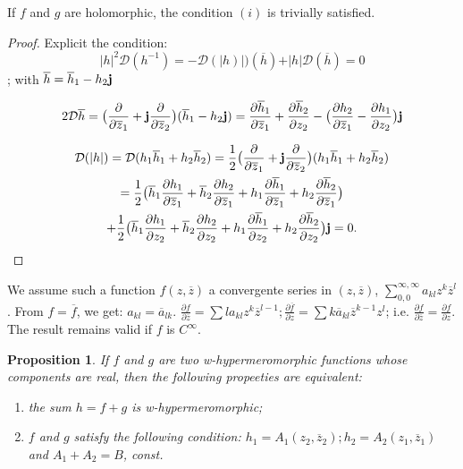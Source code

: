 \documentclass[12pt]{amsart}
\newtheorem{prop}[thm]{Proposition}
\theoremstyle{definition}
\begin{document}
If $f$ and $g$ are holomorphic, the condition $(i)$ is trivially satisfied. 

\begin{proof}Explicit the condition: $${\vert h\vert}^2{\mathcal D}(h^{-1})=-{\mathcal D}(\vert h)\vert)(\overline {h})+\vert h\vert {\mathcal D}(\overline {h})=0$$; with $\overline h=\overline h_1-h_2{\bf j}$ 
 

$$
2{\mathcal D}\overline h=\big(\frac{\partial}{\partial\overline z_1}
+{\bf j}\frac{\partial}{\partial\overline z_2}\big)(\overline h_1-h_2{\bf j})= \frac{\partial\overline h_1}{\partial\overline z_1}+\frac{\partial \overline h_2}{\partial z_2}-\big(\frac{\partial h_2}{\partial\overline z_1}-\frac{\partial h_1}{\partial z_2}\big){\bf j}
$$

\begin{multline*}
{\mathcal D}(\vert h\vert)={\mathcal D}(h_1\overline h_1+h_2\overline h_2)=\frac{1}{2}\big(\frac{\partial}{\partial\overline z_1}
+{\bf j}\frac{\partial}{\partial\overline z_2}\big)(h_1\overline h_1+h_2\overline h_2)
\\
=
\frac{1}{2}\big(\overline h_1\frac{\partial h_1}{\partial\overline z_1} +\overline h_2\frac{\partial h_2}{\partial\overline z_1} +h_1\frac{\partial\overline h_1}{\partial\overline z_1} +h_2\frac{\partial\overline h_2}{\partial\overline z_1}\big)
\\
+\frac{1}{2}\big(\overline h_1\frac{\partial h_1}{\partial z_2} +\overline h_2\frac{\partial h_2}{\partial z_2}+h_1\frac{\partial\overline h_1}{\partial z_2} +h_2\frac{\partial\overline h_2}{\partial z_2}\big){\bf j}=0.
\end{multline*}\end{proof}

 We assume such a function $f(z,\overline z)$ a convergente series in $(z,\overline z)$, $\displaystyle \sum_{0,0}^{\infty,\infty} a_{kl}z^k\overline z^l$. From $f=\overline f$, we get: $a_{kl}=\overline a_{lk}$. 
$\displaystyle\frac{\partial f}{\partial\overline z}=\sum la_{kl}z^k\overline z^{l-1}; \frac{\partial\overline f}{\partial z}=\sum k\overline a_{kl}\overline z^{k-1}z^l$; i.e. $\displaystyle\frac{\partial f}{\partial\overline z}=\frac{\partial f}{\partial z}$. The result remains valid if $f$ is $C^\infty$.

\begin{prop}If $f$ and $g$ are two w-hypermeromorphic functions whose components are real, then the following propeeties are equivalent:
\begin{enumerate}
\item[$(i)$] the sum $h=f+g$ is w-hypermeromorphic; 
\item[$(ii)$] $f$ and $g$ satisfy the following condition:
$h_1=A_1(z_2,\overline z_2); h_2=A_2(z_1,\overline z_1)$ and $A_1+A_2=B$, const.
\end{enumerate}
\end{prop}
\end{document}
